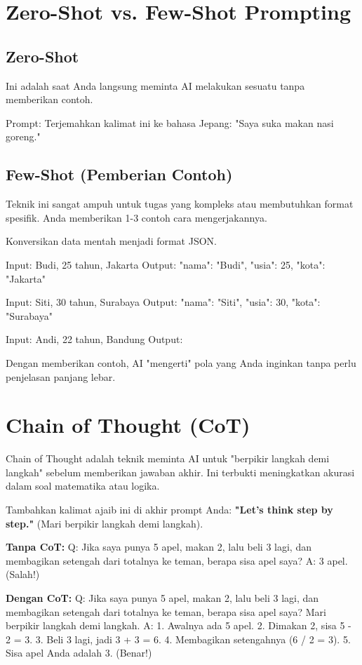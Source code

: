 \section{Zero-Shot vs. Few-Shot Prompting}

\subsection{Zero-Shot}
Ini adalah saat Anda langsung meminta AI melakukan sesuatu tanpa memberikan contoh.
\begin{codeblock}
Prompt: Terjemahkan kalimat ini ke bahasa Jepang: "Saya suka makan nasi goreng."
\end{codeblock}

\subsection{Few-Shot (Pemberian Contoh)}
Teknik ini sangat ampuh untuk tugas yang kompleks atau membutuhkan format spesifik. Anda memberikan 1-3 contoh cara mengerjakannya.

\begin{promptbox}[title=Few-Shot Example]
Konversikan data mentah menjadi format JSON.

Input: Budi, 25 tahun, Jakarta
Output: {"nama": "Budi", "usia": 25, "kota": "Jakarta"}

Input: Siti, 30 tahun, Surabaya
Output: {"nama": "Siti", "usia": 30, "kota": "Surabaya"}

Input: Andi, 22 tahun, Bandung
Output:
\end{promptbox}

Dengan memberikan contoh, AI "mengerti" pola yang Anda inginkan tanpa perlu penjelasan panjang lebar.

\section{Chain of Thought (CoT)}

Chain of Thought adalah teknik meminta AI untuk "berpikir langkah demi langkah" sebelum memberikan jawaban akhir. Ini terbukti meningkatkan akurasi dalam soal matematika atau logika.

\begin{tipbox}
Tambahkan kalimat ajaib ini di akhir prompt Anda:
\textbf{"Let's think step by step."} (Mari berpikir langkah demi langkah).
\end{tipbox}

\begin{promptbox}[title=Perbandingan CoT]
\textbf{Tanpa CoT:}
Q: Jika saya punya 5 apel, makan 2, lalu beli 3 lagi, dan membagikan setengah dari totalnya ke teman, berapa sisa apel saya?
A: 3 apel. (Salah!)

\textbf{Dengan CoT:}
Q: Jika saya punya 5 apel, makan 2, lalu beli 3 lagi, dan membagikan setengah dari totalnya ke teman, berapa sisa apel saya? Mari berpikir langkah demi langkah.
A:
1. Awalnya ada 5 apel.
2. Dimakan 2, sisa 5 - 2 = 3.
3. Beli 3 lagi, jadi 3 + 3 = 6.
4. Membagikan setengahnya (6 / 2 = 3).
5. Sisa apel Anda adalah 3. (Benar!)
\end{promptbox}


